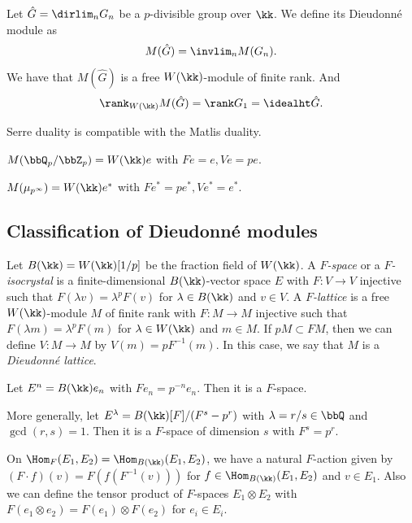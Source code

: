 Let $\hat{G} = \dirlim_n G_n$ be a $p$-divisible group over $\kk$.
We define its Dieudonn\'e module as
\[ M(\hat{G}) = \invlim_n M(G_n). \]
We have that $M(\hat{G})$ is a free $W(\kk)$-module of finite rank.
And
\[ \rank_{W(\kk)} M(\hat{G}) = \rank G_1 = \idealht \hat{G}. \]

\begin{theorem}
	Serre duality is compatible with the Matlis duality.
\end{theorem}

\begin{example}
	$M(\bbQ_p/\bbZ_p) = W(\kk) e$ with $Fe = e, Ve = pe$.

	$M(\mu_{p^\infty}) = W(\kk) e^*$ with $Fe^* = pe^*, Ve^* = e^*$.
\end{example}



\subsection{Classification of Dieudonn\'e modules}

Let $B(\kk) = W(\kk)[1/p]$ be the fraction field of $W(\kk)$.
A \emph{$F$-space} or a \emph{$F$-isocrystal} is a finite-dimensional $B(\kk)$-vector space $E$ with $F: V \to V$ injective such that $F(\lambda v) = \lambda^p F(v)$ for $\lambda \in B(\kk)$ and $v \in V$.
A \emph{$F$-lattice} is a free $W(\kk)$-module $M$ of finite rank with $F: M \to M$ injective such that $F(\lambda m) = \lambda^p F(m)$ for $\lambda \in W(\kk)$ and $m \in M$.
If $pM \subset FM$, then we can define $V: M \to M$ by $V(m) = pF^{-1}(m)$.
In this case, we say that $M$ is a \emph{Dieudonn\'e lattice}.

\begin{example}
	Let $E^n = B(\kk) e_n$ with $Fe_n = p^{-n} e_n$.
	Then it is a $F$-space.

	More generally, let $E^{\lambda} = B(\kk) [F] / (F^s - p^r)$ with $\lambda = r/s \in \bbQ$ and $\gcd(r,s) = 1$.
	Then it is a $F$-space of dimension $s$ with $F^s = p^r$.
\end{example}

On $\Hom_{F}(E_1, E_2) = \Hom_{B(\kk)}(E_1, E_2)$, we have a natural $F$-action given by $(F \cdot f)(v) = F(f(F^{-1}(v)))$ for $f \in \Hom_{B(\kk)}(E_1, E_2)$ and $v \in E_1$.
Also we can define the tensor product of $F$-spaces $E_1 \otimes E_2$ with $F(e_1 \otimes e_2) = F(e_1) \otimes F(e_2)$ for $e_i \in E_i$.

